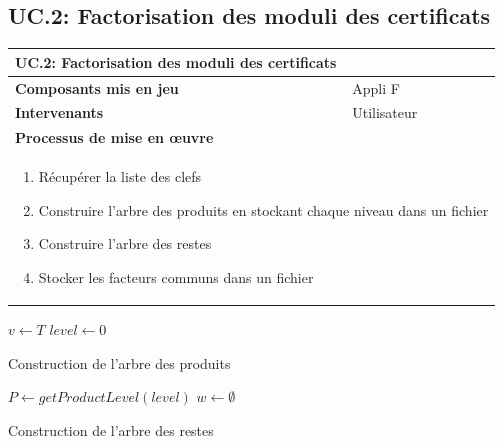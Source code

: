 \documentclass[a4paper,11pt,french]{article}
\begin{document}
\subsection{UC.2: Factorisation des moduli des certificats}
\begin{center}
	\vspace*{0.7cm}
	\begin{tabularx}{16cm}{|l|X|}
	\hline
	\multicolumn{2}{|l|}{\textbf{UC.2: Factorisation des moduli des certificats}}\\
	\hline
	\textbf{Composants mis en jeu} & Appli F\\
	\hline
	\textbf{Intervenants} & Utilisateur\\
	\hline
	\multicolumn{2}{|l|}{\textbf{Processus de mise en \oe uvre}}\\
	\hline
	\multicolumn{2}{|p{15cm}|}{
	\begin{enumerate}
	\item Récupérer la liste des clefs
	\item Construire l'arbre des produits en stockant chaque niveau dans un fichier
	\item Construire l'arbre des restes
	\item Stocker les facteurs communs dans un fichier
	\end{enumerate}
	}\\
	\hline
	\end{tabularx}
\end{center}
\begin{algorithm}[H]
\label{alg:productTree}
 $v \leftarrow T$\;
 $level \leftarrow 0$\;
 \caption{Construction de l'arbre des produits}
 
\end{algorithm}
\vspace{1cm}
\begin{algorithm}[H]
 \label{alg:remainderTree}
 $P \leftarrow getProductLevel(level)$\;
 $w \leftarrow \emptyset$\;
 \caption{Construction de l'arbre des restes}
\end{algorithm}
\end{document}
